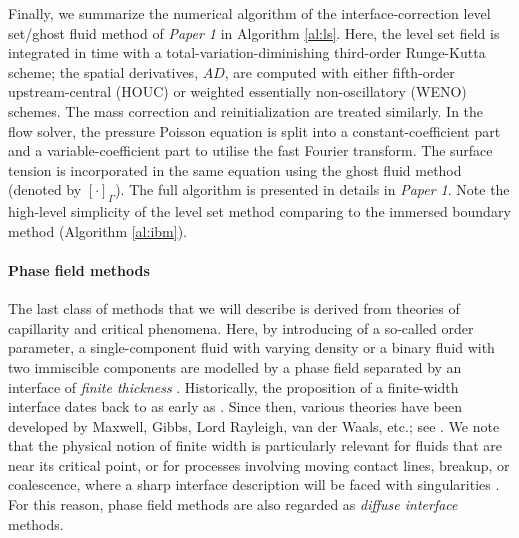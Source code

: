 Finally, we summarize the numerical algorithm of the interface-correction level set/ghost fluid method of \emph{Paper 1} in Algorithm \ref{al:ls}.
Here, the level set field is integrated in time with a total-variation-diminishing third-order Runge-Kutta scheme; the spatial derivatives, ${AD}$, are computed with either fifth-order upstream-central (HOUC) or weighted essentially non-oscillatory (WENO) schemes. The mass correction and reinitialization are treated similarly.
In the flow solver, the pressure Poisson equation is split into a constant-coefficient part and a variable-coefficient part to utilise the fast Fourier transform.
The surface tension is incorporated in the same equation using the ghost fluid method (denoted by $[\cdot]_\Gamma$).
The full algorithm is presented in details in \emph{Paper 1}. Note the high-level simplicity of the level set method comparing to the immersed boundary method (Algorithm \ref{al:ibm}).


\medskip
\paragraph{\bf Phase field methods}

The last class of methods that we will describe is derived from theories of capillarity and critical phenomena.
Here, by introducing of a so-called order parameter, a single-component fluid with varying density or a binary fluid with two immiscible components are modelled by a phase field separated by an interface of \emph{finite thickness} \citep{Anderson_McFadden_Wheeler}.
Historically, the proposition of a finite-width interface dates back to as early as \cite{Poisson1831}. Since then, various theories have been developed by Maxwell, Gibbs, Lord Rayleigh, van der Waals, etc.; see \eg \cite{van-der-waals1893, Cahn1961}.
We note that the physical notion of finite width is particularly relevant for fluids that are near its critical point, or for processes involving moving contact lines, breakup, or coalescence, where a sharp interface description will be faced with singularities \citep{Zhang_Mohseni_2018, Eggers1997}.
For this reason, phase field methods are also regarded as \emph{diffuse interface} methods.

